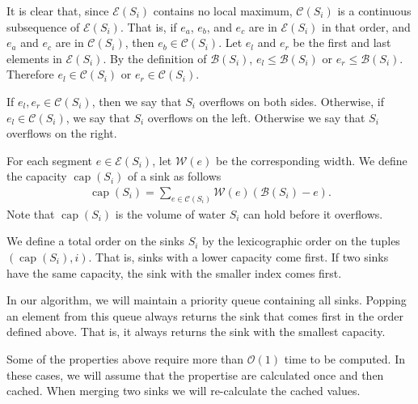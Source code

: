 \documentclass[11pt,a4paper]{article}
\newcommand{\bO}{\mathcal{O}}
\DeclareMathOperator{\capp}{cap}
\begin{document}
It is clear that, since $\mathcal{E}(S_i)$ contains no local maximum, $\mathcal{C}(S_i)$ is a continuous subsequence of $\mathcal{E}(S_i)$.
That is, if $e_a$, $e_b$, and $e_c$ are in $\mathcal{E}(S_i)$ in that order, and $e_a$ and $e_c$ are in $\mathcal{C}(S_i)$, then $e_b\in\mathcal{C}(S_i)$.
Let $e_l$ and $e_r$ be the first and last elements in $\mathcal{E}(S_i)$.
By the definition of $\mathcal{B}(S_i)$, $e_l\le\mathcal{B}(S_i)$ or $e_r\le\mathcal{B}(S_i)$.
Therefore $e_l\in\mathcal{C}(S_i)$ or $e_r\in\mathcal{C}(S_i)$.

If $e_l,e_r\in\mathcal{C}(S_i)$, then we say that $S_i$ overflows on both sides.
Otherwise, if $e_l\in\mathcal{C}(S_i)$, we say that $S_i$ overflows on the left.
Otherwise we say that $S_i$ overflows on the right.

For each segment $e\in\mathcal{E}(S_i)$, let $\mathcal{W}(e)$ be the corresponding width.
We define the capacity $\capp(S_i)$ of a sink as follows
\begin{align*}
    \capp(S_i) = \sum_{e\in\mathcal{C}(S_i)} \mathcal{W}(e)(\mathcal{B}(S_i)-e).
\end{align*}
Note that $\capp(S_i)$ is the volume of water $S_i$ can hold before it overflows.

We define a total order on the sinks $S_i$ by the lexicographic order on the tuples $(\capp(S_i), i)$.
That is, sinks with a lower capacity come first.
If two sinks have the same capacity, the sink with the smaller index comes first.

In our algorithm, we will maintain a priority queue containing all sinks.
Popping an element from this queue always returns the sink that comes first in the order defined above.
That is, it always returns the sink with the smallest capacity.

Some of the properties above require more than $\bO(1)$ time to be computed.
In these cases, we will assume that the propertise are calculated once and then cached.
When merging two sinks we will re-calculate the cached values.
\end{document}
